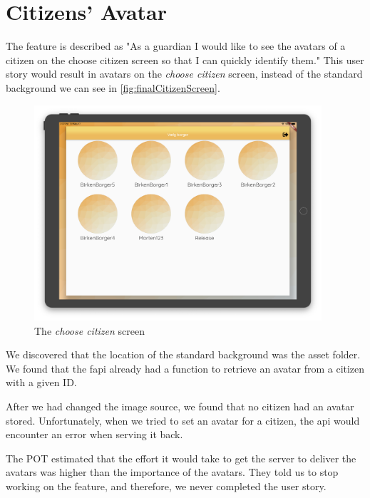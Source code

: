 \section{Citizens' Avatar}

The feature is described as "As a \gls{guardian} I would like to see the avatars of a \gls{citizen} on the choose citizen screen so that I can quickly identify them." This user story would result in avatars on the \textit{choose citizen} screen, instead of the standard background we can see in \autoref{fig:finalCitizenScreen}.

\begin{figure}[H]
    \begin{center}
        \includegraphics[width=0.95\textwidth]{figures/FinalScreen/chooseCitizenScreen.png}
    \end{center}
    \caption{The \textit{choose citizen} screen}
    \label{fig:finalCitizenScreen}
\end{figure}

We discovered that the location of the standard background was the asset folder. We found that the \gls{fapi} already had a function to retrieve an avatar from a citizen with a given ID.

After we had changed the image source, we found that no \gls{citizen} had an avatar stored. Unfortunately, when we tried to set an avatar for a \gls{citizen}, the \gls{api} would encounter an error when serving it back.

The \gls{POT} estimated that the effort it would take to get the server to deliver the avatars was higher than the importance of the avatars. They told us to stop working on the feature, and therefore, we never completed the user story.